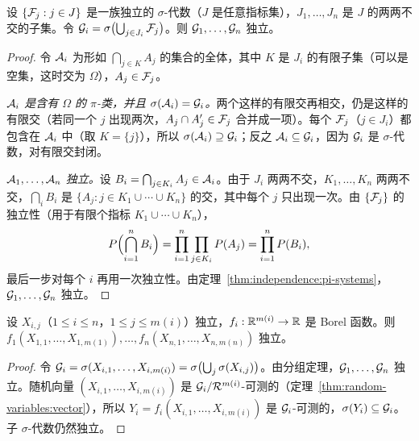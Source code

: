 \begin{theorem}[分组定理]\label{thm:independence:grouping}
设 $\{\mathcal{F}_j:j\in J\}$ 是一族独立的 $\sigma$-代数（$J$ 是任意指标集），$J_1,\dots,J_n$ 是 $J$ 的两两不交的子集。令 $\mathcal{G}_i=\sigma\bigl(\bigcup_{j\in J_i}\mathcal{F}_j\bigr)$。则 $\mathcal{G}_1,\dots,\mathcal{G}_n$ 独立。
\end{theorem}
\begin{proof}
令 $\mathcal{A}_i$ 为形如 $\bigcap_{j\in K}A_j$ 的集合的全体，其中 $K$ 是 $J_i$ 的有限子集（可以是空集，这时交为 $\Omega$），$A_j\in\mathcal{F}_j$。

\emph{$\mathcal{A}_i$ 是含有 $\Omega$ 的 $\pi$-类，并且 $\sigma(\mathcal{A}_i)=\mathcal{G}_i$。}两个这样的有限交再相交，仍是这样的有限交（若同一个 $j$ 出现两次，$A_j\cap A_j'\in\mathcal{F}_j$ 合并成一项）。每个 $\mathcal{F}_j$（$j\in J_i$）都包含在 $\mathcal{A}_i$ 中（取 $K=\{j\}$），所以 $\sigma(\mathcal{A}_i)\supseteq\mathcal{G}_i$；反之 $\mathcal{A}_i\subseteq\mathcal{G}_i$，因为 $\mathcal{G}_i$ 是 $\sigma$-代数，对有限交封闭。

\emph{$\mathcal{A}_1,\dots,\mathcal{A}_n$ 独立。}设 $B_i=\bigcap_{j\in K_i}A_j\in\mathcal{A}_i$。由于 $J_i$ 两两不交，$K_1,\dots,K_n$ 两两不交，$\bigcap_iB_i$ 是 $\{A_j:j\in K_1\cup\cdots\cup K_n\}$ 的交，其中每个 $j$ 只出现一次。由 $\{\mathcal{F}_j\}$ 的独立性（用于有限个指标 $K_1\cup\cdots\cup K_n$），
\[
P\Bigl(\bigcap_{i=1}^nB_i\Bigr)=\prod_{i=1}^n\prod_{j\in K_i}P(A_j)=\prod_{i=1}^nP(B_i),
\]
最后一步对每个 $i$ 再用一次独立性。由定理~\ref{thm:independence:pi-systems}，$\mathcal{G}_1,\dots,\mathcal{G}_n$ 独立。
\end{proof}

\begin{corollary}[不交分组上的函数]\label{cor:independence:functions}
设 $X_{i,j}$（$1\leqslant i\leqslant n$，$1\leqslant j\leqslant m(i)$）独立，$f_i:\mathbb{R}^{m(i)}\to\mathbb{R}$ 是 Borel 函数。则 $f_1(X_{1,1},\dots,X_{1,m(1)}),\dots,f_n(X_{n,1},\dots,X_{n,m(n)})$ 独立。
\end{corollary}
\begin{proof}
令 $\mathcal{G}_i=\sigma(X_{i,1},\dots,X_{i,m(i)})=\sigma\bigl(\bigcup_j\sigma(X_{i,j})\bigr)$。由分组定理，$\mathcal{G}_1,\dots,\mathcal{G}_n$ 独立。随机向量 $(X_{i,1},\dots,X_{i,m(i)})$ 是 $\mathcal{G}_i/\mathcal{R}^{m(i)}$-可测的（定理~\ref{thm:random-variables:vector}），所以 $Y_i=f_i(X_{i,1},\dots,X_{i,m(i)})$ 是 $\mathcal{G}_i$-可测的，$\sigma(Y_i)\subseteq\mathcal{G}_i$。子 $\sigma$-代数仍然独立。
\end{proof}

